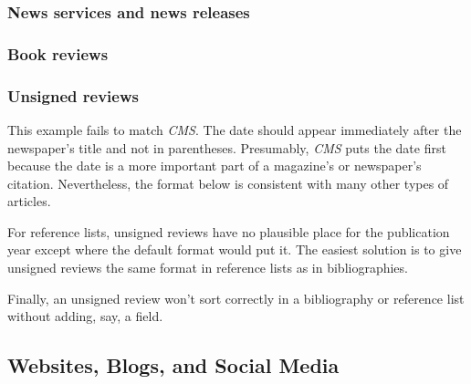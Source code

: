 \documentclass[11pt,letterpaper,oneside]{article}
\begin{document}
\subsubsection{News services and news releases}

\begin{citebib}
\item \cite{ap2015}
\end{citebib}

\setcounter{subsubsection}{201}
\subsubsection{Book reviews}

\begin{citebib}
\item \cite[B13--B14]{ratliff1999}
\item \cite{brehm2015}
\end{citebib}

\setcounter{subsubsection}{203}
\subsubsection{Unsigned reviews}

This example fails to match \textit{CMS}. The date should appear
immediately after the newspaper's title and not in parentheses.
Presumably, \textit{CMS} puts the date first because the date is a
more important part of a magazine's or newspaper's citation.
Nevertheless, the format below is consistent with many other types of
articles.

For reference lists, unsigned reviews have no plausible place for the
publication year except where the default format would put it. The
easiest solution is to give unsigned reviews the same format in
reference lists as in bibliographies.

Finally, an unsigned review won't sort correctly in a bibliography or
reference list without adding, say, a  field.

\begin{citebib}
\item \cite{zeitung1828}
\end{citebib}

\setcounter{subsection}{6}
\subsection{Websites, Blogs, and Social Media}
\setcounter{subsection}{14}
\end{document}
